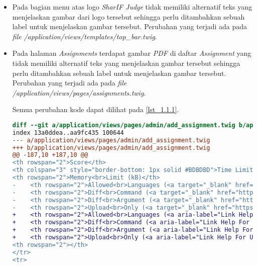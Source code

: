 \begin{itemize}
	\item Pada bagian menu atas logo \textit{SharIF Judge} tidak memiliki alternatif teks yang menjelaskan gambar dari logo tersebut sehingga perlu ditambahkan sebuah label untuk menjelaskan gambar tersebut. Perubahan yang terjadi ada pada \textit{file} \textit{/application/views/templates/top\_bar.twig}.

	\item Pada halaman \textit{Assignments} terdapat gambar \textit{PDF} di daftar \textit{Assignment} yang tidak memiliki alternatif teks yang menjelaskan gambar tersebut sehingga perlu ditambahkan sebuah label untuk menjelaskan gambar tersebut. Perubahan yang terjadi ada pada \textit{file} \textit{/application/views/pages/assignments.twig}.
	
	Semua perubahan kode dapat dilihat pada \ref{lst_1.1.1}.
	
\begin{lstlisting}[language=diff, caption=Perubahan untuk mematuhi kriteria 1.1.1, label=lst_1.1.1, basicstyle=\ttfamily, frame=single,
columns=fullflexible, keepspaces=true, breaklines=true]
diff --git a/application/views/pages/admin/add_assignment.twig b/application/views/pages/admin/add_assignment.twig
index 13a0ddea..aa9fc435 100644
--- a/application/views/pages/admin/add_assignment.twig
+++ b/application/views/pages/admin/add_assignment.twig
@@ -187,10 +187,10 @@
<th rowspan="2">Score</th>
<th colspan="3" style="border-bottom: 1px solid #BDBDBD">Time Limit (ms)</th>
<th rowspan="2">Memory<br>Limit (kB)</th>
-    <th rowspan="2">Allowed<br>Languages (<a target="_blank" href="https://github.com/ifunpar/Sharif-Judge/blob/docs/v1.4/add_assignment.md#allowed-languages">?</a>)</th>
-    <th rowspan="2">Diff<br>Command (<a target="_blank" href="https://github.com/ifunpar/Sharif-Judge/blob/docs/v1.4/add_assignment.md#diff-command">?</a>)</th>
-    <th rowspan="2">Diff<br>Argument (<a target="_blank" href="https://github.com/ifunpar/Sharif-Judge/blob/docs/v1.4/add_assignment.md#diff-arguments">?</a>)</th>
-    <th rowspan="2">Upload<br>Only (<a target="_blank" href="https://github.com/ifunpar/Sharif-Judge/blob/docs/v1.4/add_assignment.md#upload-only">?</a>)</th>
+    <th rowspan="2">Allowed<br>Languages (<a aria-label="Link Help For Languages" target="_blank" href="https://github.com/ifunpar/Sharif-Judge/blob/docs/v1.4/add_assignment.md#allowed-languages">?</a>)</th>
+    <th rowspan="2">Diff<br>Command (<a aria-label="Link Help For Diff Command" target="_blank" href="https://github.com/ifunpar/Sharif-Judge/blob/docs/v1.4/add_assignment.md#diff-command">?</a>)</th>
+    <th rowspan="2">Diff<br>Argument (<a aria-label="Link Help For Diff Argument" target="_blank" href="https://github.com/ifunpar/Sharif-Judge/blob/docs/v1.4/add_assignment.md#diff-arguments">?</a>)</th>
+    <th rowspan="2">Upload<br>Only (<a aria-label="Link Help For Upload Only" target="_blank" href="https://github.com/ifunpar/Sharif-Judge/blob/docs/v1.4/add_assignment.md#upload-only">?</a>)</th>
<th rowspan="2"></th>
</tr>
<tr>


\end{lstlisting}
\end{itemize}
